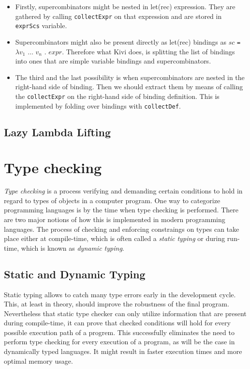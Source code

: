 \documentclass[12pt,a4paper]{report}
\begin{document}
\begin{itemize}
  \item Firstly, supercombinators might be nested in let(rec)
    expression. They are gathered by calling \texttt{collectExpr} on that
    expression and are stored in \texttt{exprScs} variable.
  \item Supercombinators might also be present directly as let(rec)
    bindings as $sc$ \texttt{=} $\lambda v_1$ $\ldots$ $v_n$ . $expr$.
    Therefore what Kivi does, is splitting the list of bindings into ones that
    are simple variable bindings and supercombinators.
  \item The third and the last possibility is when supercombinators are nested
    in the right-hand side of binding. Then we should extract them by means of
    calling the \texttt{collectExpr} on the right-hand side of binding
    definition. This is implemented by folding over bindings with
    \texttt{collectDef}.
\end{itemize}

\section{Lazy Lambda Lifting}

\chapter{Type checking}
\textit{Type checking} is a process verifying and demanding certain conditions
to hold in regard to types of objects in a computer program. One way to
categorize programming languages is by the time when type checking is
performed. There are two major notions of how this is implemented in modern
programming languages. The process of checking and enforcing constraings on
types can take place either at compile-time, which is often called a
\textit{static typing} or during run-time, which is known as \textit{dynamic
typing}.

\section{Static and Dynamic Typing}
Static typing allows to catch many type errors early in the development cycle.
This, at least in theory, should improve the robustness of the final program.
Nevertheless that static type checker can only utilize information that are
present during compile-time, it can prove that checked conditions will hold for
every possible execution path of a progrem. This successfully eliminates the
need to perform type checking for every execution of a program, as will be the
case in dynamically typed languages. It might result in faster execution times
and more optimal memory usage.
\end{document}
